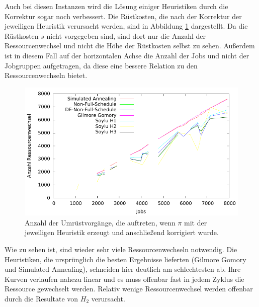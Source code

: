 \documentclass{scrreprt}
\begin{document}
Auch bei diesen Instanzen wird die Lösung einiger Heuristiken durch die Korrektur sogar noch verbessert.
Die Rüstkosten, die nach der Korrektur der jeweiligen Heuristik verursacht werden, sind in Abbildung \ref{abb:coplot} dargestellt.
Da die Rüstkosten $s$ nicht vorgegeben sind, sind dort nur die Anzahl der Ressourcenwechsel und nicht die Höhe der Rüstkosten selbst zu sehen.
Außerdem ist in diesem Fall auf der horizontalen Achse die Anzahl der Jobs und nicht der Jobgruppen aufgetragen, 
da diese eine bessere Relation zu den Ressourcenwechseln bietet.
\begin{figure}
    \begin{center}
        \includegraphics[width=.8\textwidth]{../prog/heuristics/plots/coplot.pdf}
    \end{center}
    \caption{
        \label{abb:coplot}
        Anzahl der Umrüstvorgänge, die auftreten, wenn $\pi$ mit der jeweiligen Heuristik erzeugt und anschließend korrigiert wurde.
    }
\end{figure}
Wie zu sehen ist, sind wieder sehr viele Ressourcenwechseln notwendig.
Die Heuristiken, die ursprünglich die besten Ergebnisse lieferten (Gilmore Gomory und Simulated Annealing), schneiden hier deutlich am schlechtesten ab.
Ihre Kurven verlaufen nahezu linear und es muss offenbar fast in jedem Zyklus die Ressource gewechselt werden.
Relativ wenige Ressourcenwechsel werden offenbar durch die Resultate von $H_2$ verursacht.
\end{document}

